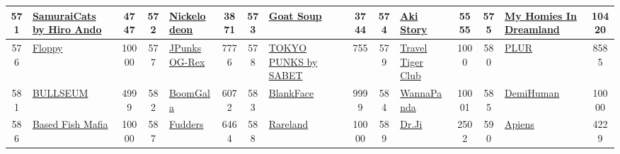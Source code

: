 \begin{table*}[]
{\begin{tabular}{|c|l|c|c|l|c|c|l|c|c|l|c|c|l|c|}
        571   & \href{https://www.samuraicats.io}{SamuraiCats by Hiro Ando}                        & 4747              & 572   & \href{https://nickelodeon.xyz/marketplace}{Nickelodeon}                                           & 3871              & 573   & \href{http://goatsoup.com/}{Goat Soup}                                            & 3744              & 574   & \href{https://www.aki-story.com/}{Aki Story}                                  & 5555              & 575   & \href{http://Myhomies.com}{My Homies In Dreamland}                                        & 10420                                   \\ \hline
        576   & \href{http://floppynft.io}{Floppy}                                                 & 10000             & 577   & \href{https://www.jurassicpunks.io/}{JPunks OG-Rex}                                               & 7776              & 578   & \href{http://www.sabet.com}{TOKYO PUNKS by SABET}                                 & 755               & 579   & \href{https://www.travala.com/nft}{Travel Tiger Club}                         & 1000              & 580   & \href{http://plur.io}{PLUR}                                                               & 8585                                    \\ \hline
        581   & \href{https://bullseum.io}{BULLSEUM}                                               & 4999              & 582   & \href{http://boomgala.io}{BoomGala}                                                               & 6072              & 583   & \href{https://opensea.io/collection/blankfaceofficial}{BlankFace}                 & 9999              & 584   & \href{https://wannapanda.com/}{WannaPanda}                                    & 10001             & 585   & \href{https://www.demiversestudio.com/}{DemiHuman}                                        & 10000                                   \\ \hline
        586   & \href{https://basedfishmafia.com/}{Based Fish Mafia}                               & 10000             & 587   & \href{https://fudderverse.com/}{Fudders}                                                          & 6464              & 588   & \href{http://mlabs.land}{Rareland}                                                & 10000             & 589   & \href{https://www.drji.club/}{Dr.Ji}                                          & 2502              & 590   & \href{https://theapiens.com/}{Apiens}                                                     & 4229                                    \\ \hline

\end{tabular}}
\end{table*}
